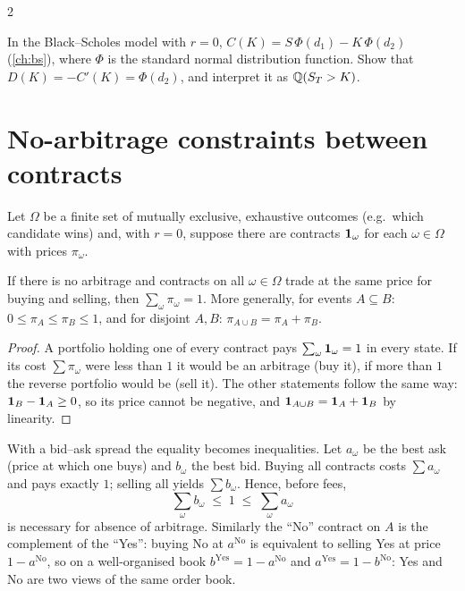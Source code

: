 \begin{paracol}{2}
\begin{exercise}\label{ch14:ex-digital}
In the Black--Scholes model with $r=0$, $C(K)=S\,\Phi(d_1)-K\,\Phi(d_2)$ (\cref{ch:bs}), where $\Phi$ is the standard normal
distribution function. Show that $D(K)=-C'(K)=\Phi(d_2)$, and interpret it as $\mathbb{Q}(S_T>K)$.
\end{exercise}

\section{No-arbitrage constraints between contracts}\label{ch14:sec-noarb}

Let $\Omega$ be a finite set of mutually exclusive, exhaustive outcomes (e.g.\ which candidate wins) and, with $r=0$,
suppose there are contracts $\mathbf{1}_{\omega}$ for each $\omega\in\Omega$ with prices $\pi_\omega$.

\begin{proposition}\label{ch14:prop-sum}
If there is no arbitrage and contracts on all $\omega\in\Omega$ trade at the same price for buying and selling, then $\sum_\omega\pi_\omega=1$.
More generally, for events $A\subseteq B$: $0\le\pi_A\le\pi_B\le1$, and for disjoint $A,B$: $\pi_{A\cup B}=\pi_A+\pi_B$.
\end{proposition}
\begin{proof}
A portfolio holding one of every contract pays $\sum_\omega \mathbf{1}_\omega=1$ in every state. If its cost $\sum\pi_\omega$
were less than $1$ it would be an arbitrage (buy it), if more than $1$ the reverse portfolio would be (sell it). The
other statements follow the same way: $\mathbf{1}_B-\mathbf{1}_A\ge0$, so its price cannot be negative, and
$\mathbf{1}_{A\cup B}=\mathbf{1}_A+\mathbf{1}_B$ by linearity.
\end{proof}

With a bid--ask spread the equality becomes inequalities. Let $a_\omega$ be the best ask (price at which one buys) and $b_\omega$ the best bid.
Buying all contracts costs $\sum a_\omega$ and pays exactly $1$; selling all yields $\sum b_\omega$. Hence, before fees,
\begin{equation}\label{ch14:eq-arbband}
  \sum_{\omega} b_\omega \;\le\; 1 \;\le\; \sum_{\omega} a_\omega
\end{equation}
is necessary for absence of arbitrage. Similarly the ``No'' contract on $A$ is the complement of the ``Yes'':
buying No at $a^{\mathrm{No}}$ is equivalent to selling Yes at price $1-a^{\mathrm{No}}$, so on a well-organised book
$b^{\mathrm{Yes}}=1-a^{\mathrm{No}}$ and $a^{\mathrm{Yes}}=1-b^{\mathrm{No}}$: Yes and No are two views of the same order book.


\end{paracol}
